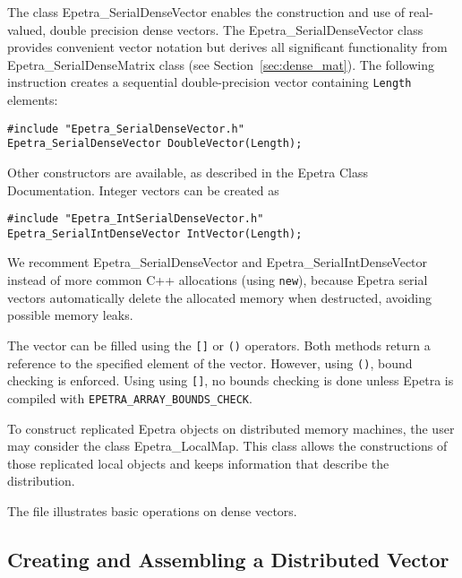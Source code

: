The class Epetra\_SerialDenseVector enables the construction and use of
real-valued, double precision dense vectors. The
Epetra\_SerialDenseVector class provides convenient vector notation but
derives all significant functionality from Epetra\_SerialDenseMatrix
class (see Section~\ref{sec:dense_mat}). The following instruction
creates a sequential double-precision vector containing {\tt Length}
elements:
\begin{verbatim}
#include "Epetra_SerialDenseVector.h"
Epetra_SerialDenseVector DoubleVector(Length);
\end{verbatim}
Other constructors are available, as described in the Epetra Class
Documentation.
Integer vectors can be created as
\begin{verbatim}
#include "Epetra_IntSerialDenseVector.h"
Epetra_SerialIntDenseVector IntVector(Length);
\end{verbatim}
We recomment Epetra\_SerialDenseVector and Epetra\_SerialIntDenseVector
instead of more common C++ allocations (using \verb!new!), because
Epetra serial vectors automatically delete the allocated memory when
destructed, avoiding possible memory leaks. 

The vector can be filled using the \verb![]! or \verb!()!  operators.
Both methods return a reference to the specified element of the vector.
However, using \verb!()!, bound checking is enforced. Using using
\verb![]!, no bounds checking is done unless Epetra is compiled with
\verb!EPETRA_ARRAY_BOUNDS_CHECK!.

\begin{remark}
  To construct replicated Epetra objects on distributed memory machines,
  the user may consider the class Epetra\_LocalMap. This class allows
  the constructions of those replicated local objects and keeps
  information that describe the distribution.
\end{remark}

The file  illustrates basic operations on dense
vectors.


\subsection{Creating and Assembling a Distributed Vector}
\label{sec:distr_vec}

